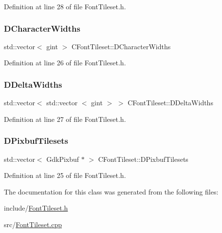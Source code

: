 Definition at line 28 of file Font\+Tileset.\+h.

\hypertarget{classCFontTileset_ad25347b5350a8380be8c550d9f2e2798}{}\label{classCFontTileset_ad25347b5350a8380be8c550d9f2e2798} 
\subsubsection{\texorpdfstring{D\+Character\+Widths}{DCharacterWidths}}
{\footnotesize\ttfamily std\+::vector$<$ gint $>$ C\+Font\+Tileset\+::\+D\+Character\+Widths\hspace{0.3cm}{\ttfamily [protected]}}



Definition at line 26 of file Font\+Tileset.\+h.

\hypertarget{classCFontTileset_a1e253853e14282e9582a7f47dace8f70}{}\label{classCFontTileset_a1e253853e14282e9582a7f47dace8f70} 
\subsubsection{\texorpdfstring{D\+Delta\+Widths}{DDeltaWidths}}
{\footnotesize\ttfamily std\+::vector$<$ std\+::vector $<$ gint $>$ $>$ C\+Font\+Tileset\+::\+D\+Delta\+Widths\hspace{0.3cm}{\ttfamily [protected]}}



Definition at line 27 of file Font\+Tileset.\+h.

\hypertarget{classCFontTileset_ae6e92dd613809fb15892b51e0e6b4940}{}\label{classCFontTileset_ae6e92dd613809fb15892b51e0e6b4940} 
\subsubsection{\texorpdfstring{D\+Pixbuf\+Tilesets}{DPixbufTilesets}}
{\footnotesize\ttfamily std\+::vector$<$ Gdk\+Pixbuf $\ast$ $>$ C\+Font\+Tileset\+::\+D\+Pixbuf\+Tilesets\hspace{0.3cm}{\ttfamily [protected]}}



Definition at line 25 of file Font\+Tileset.\+h.



The documentation for this class was generated from the following files\+:\begin{DoxyCompactItemize}
\item 
include/\hyperlink{FontTileset_8h}{Font\+Tileset.\+h}\item 
src/\hyperlink{FontTileset_8cpp}{Font\+Tileset.\+cpp}\end{DoxyCompactItemize}
